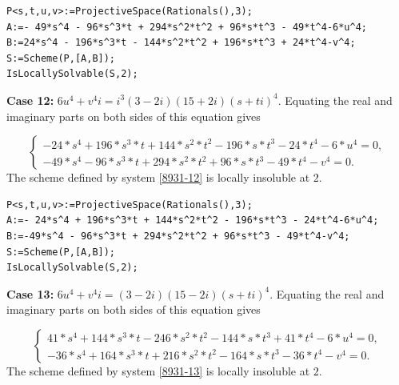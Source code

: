 \documentclass[a4paper,12pt,english,reqno]{amsart}
\begin{document}
\begin{lstlisting}
P<s,t,u,v>:=ProjectiveSpace(Rationals(),3);
A:=- 49*s^4 - 96*s^3*t + 294*s^2*t^2 + 96*s*t^3 - 49*t^4-6*u^4;
B:=24*s^4 - 196*s^3*t - 144*s^2*t^2 + 196*s*t^3 + 24*t^4-v^4;
S:=Scheme(P,[A,B]);
IsLocallySolvable(S,2);
\end{lstlisting}


{\bf Case 12:} $6u^4+v^4i=i^3(3-2i)(15+2i)(s+ti)^4$.  Equating the real and imaginary parts on both sides of this equation gives

\begin{equation}\label{8931-12}
\begin{cases}
-24*s^4 + 196*s^3*t + 144*s^2*t^2 - 196*s*t^3 - 24*t^4 - 6*u^4=0,\\
-49*s^4 - 96*s^3*t + 294*s^2*t^2 + 96*s*t^3 - 49*t^4 - v^4=0.
\end{cases}
\end{equation}
The scheme defined by system \eqref{8931-12} is locally insoluble at $2$.

\begin{lstlisting}
P<s,t,u,v>:=ProjectiveSpace(Rationals(),3);
A:=- 24*s^4 + 196*s^3*t + 144*s^2*t^2 - 196*s*t^3 - 24*t^4-6*u^4;
B:=-49*s^4 - 96*s^3*t + 294*s^2*t^2 + 96*s*t^3 - 49*t^4-v^4;
S:=Scheme(P,[A,B]);
IsLocallySolvable(S,2);
\end{lstlisting}
{\bf Case 13:} $6u^4+v^4i=(3-2i)(15-2i)(s+ti)^4$. Equating the real and imaginary parts on both sides of this equation gives

\begin{equation}\label{8931-13}
\begin{cases}
41*s^4 + 144*s^3*t - 246*s^2*t^2 - 144*s*t^3 + 41*t^4 - 6*u^4=0,\\
-36*s^4 + 164*s^3*t + 216*s^2*t^2 - 164*s*t^3 - 36*t^4 - v^4=0.
\end{cases}
\end{equation}
The scheme defined by system \eqref{8931-13} is locally insoluble at $2$.
\end{document}
